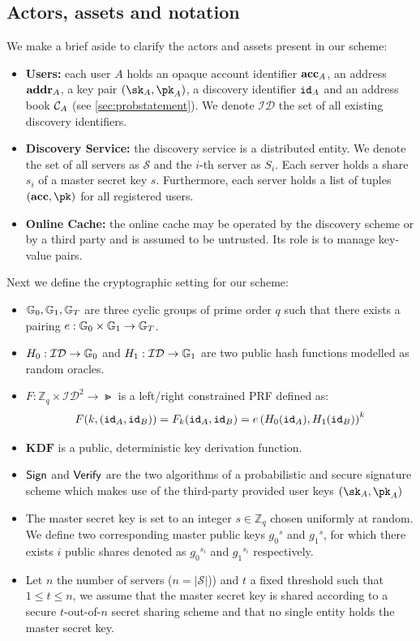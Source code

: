 	\subsection{Actors, assets and notation}
	
		\noindent We make a brief aside to clarify the actors and assets present in our scheme:		
		\begin{itemize}
			\item \textbf{Users:} each user $A$ holds an opaque account identifier $\mathbf{acc}_A$, an address $\mathbf{addr}_A$, a key pair $(\sk_A,\pk_A)$, a discovery identifier $\mathtt{id}_A$ and an address book $\mathcal{C}_{A}$ (see \autoref{sec:probstatement}). We denote $\mathcal{ID}$ the set of all existing discovery identifiers.
			\item \textbf{Discovery Service:} the discovery service is a distributed entity. We denote the set of all servers as $\mathcal{S}$ and the $i$-th server as $S_i$. Each server holds a share $s_i$ of a master secret key $s$. Furthermore, each server holds a list of tuples $(\acc, \pk)$ for all registered users.
			\item \textbf{Online Cache:} the online cache may be operated by the discovery scheme or by a third party and is assumed to be untrusted. Its role is to manage key-value pairs.
			
			\end{itemize}
			
		\noindent Next we define the cryptographic setting for our scheme:
		\begin{itemize}
			\item $\mathbb{G}_0, \mathbb{G}_1, \mathbb{G}_T$ are three cyclic groups of prime order $q$ such that there exists a pairing $e : \mathbb{G}_0 \times \mathbb{G}_1 \rightarrow \mathbb{G}_T$.
			\item $H_0: \mathcal{ID}\rightarrow \mathbb{G}_0$  and $H_1: \mathcal{ID} \rightarrow \mathbb{G}_1$ are two public hash functions modelled as random oracles.
			\item $F: \mathbb{Z}_q \times \mathcal{ID}^2  \rightarrow \Gt$ is a left/right constrained PRF defined as: \begin{equation}
				F(k, (\mathtt{id}_A, \mathtt{id}_B)) = F_k(\mathtt{id}_A, \mathtt{id}_B)= e\left(H_0(\mathtt{id}_A), H_1(\mathtt{id}_B) \right)^k
			\end{equation}
			\item $\mathbf{KDF}$ is a public, deterministic key derivation function.
			\item $\mathsf{Sign}$ and $\mathsf{Verify}$ are the two algorithms of a probabilistic and secure signature scheme which makes use of the third-party provided user keys $(\sk_A,\pk_A)$ 
			\item The master secret key is set to an integer $s \in \mathbb{Z}_q$ chosen uniformly at random. We define two corresponding master public keys ${g_0}^s$ and ${g_1}^s$, for which there exists $i$ public shares denoted as ${g_0}^{s_i}$ and ${g_1}^{s_i}$ respectively.
			\item Let $n$ the number of servers ($n=|\mathcal{S}|$)) and $t$ a fixed threshold such that $1 \leq t \leq n$, we assume that the master secret key is shared according to a secure $t$-out-of-$n$ secret sharing scheme and that no single entity holds the master secret key.
		\end{itemize}

